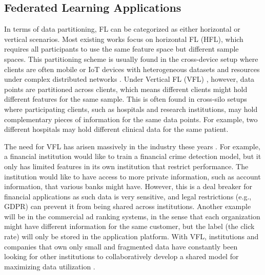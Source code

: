 \documentclass[withindex,glossary,firstyr]{cam-thesis}
\begin{document}
\subsection{Federated Learning Applications}


In terms of data partitioning, FL can be categorized as either horizontal or vertical scenarios. Most existing works focus on horizontal FL (HFL), which requires all participants to use the same feature space but different sample spaces\citep{yang2019federated}. This partitioning scheme is usually found in the cross-device setup where clients are often mobile or IoT devices with heterogeneous datasets and resources under complex distributed networks \citep{yu2021toward, qiu2021zerofl}. Under Vertical FL (VFL) \citep{wei2022vertical}, however, data points are partitioned across clients, which means different clients might hold different features for the same sample. This is often found in cross-silo setups where participating clients, such as hospitals and research institutions, may hold complementary pieces of information for the same data points. For example, two different hospitals may hold different clinical data for the same patient.


The need for VFL has arisen massively in the industry these years \citep{vfl, liu2020asymmetrical}. For example, a financial institution would like to train a financial crime detection model, but it only has limited features in its own institution that restrict performance. The institution would like to have access to more private information, such as account information, that various banks might have. However, this is a deal breaker for financial applications as such data is very sensitive, and legal restrictions (e.g., GDPR) can prevent it from being shared across institutions. Another example will be in the commercial ad ranking systems, in the sense that each organization might have different information for the same customer, but the label (the click rate) will only be stored in the application platform. With VFL, institutions and companies that own only small and fragmented data have constantly been looking for other institutions to collaboratively develop a shared model for maximizing data utilization \citep{li2021survey}. 
\end{document}
